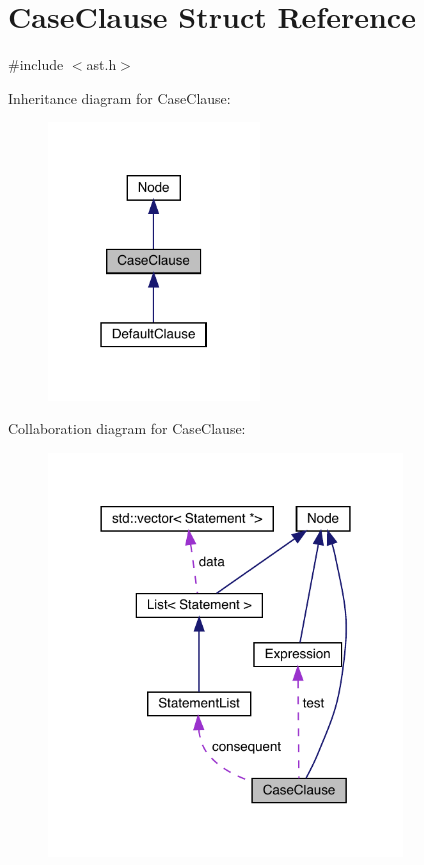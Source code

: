 \hypertarget{struct_case_clause}{}\section{Case\+Clause Struct Reference}
\label{struct_case_clause}


{\ttfamily \#include $<$ast.\+h$>$}



Inheritance diagram for Case\+Clause\+:\nopagebreak
\begin{figure}[H]
\begin{center}
\leavevmode
\includegraphics[width=159pt]{struct_case_clause__inherit__graph}
\end{center}
\end{figure}


Collaboration diagram for Case\+Clause\+:\nopagebreak
\begin{figure}[H]
\begin{center}
\leavevmode
\includegraphics[width=266pt]{struct_case_clause__coll__graph}
\end{center}
\end{figure}
